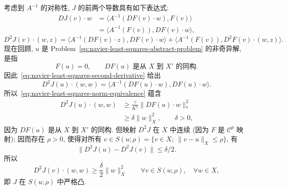 \begin{Proof}
考虑到 $A^{-1}$ 的对称性, $J$ 的前两个导数具有如下表达式:
\begin{equation}
\label{eq:navier-least-squares-first-derivative}
\begin{aligned}
DJ(v)\mathbin{\cdot}w
&=\langle A^{-1}(DF(v)\mathbin{\cdot}w),F(v)\rangle\\
&=\langle A^{-1}(F(v)),DF(v)\mathbin{\cdot}w\rangle,
\end{aligned}
\end{equation}
\begin{equation}
\label{eq:navier-least-squares-second-derivative}
D^2J(v)\mathbin{\cdot}(w,z)
=\langle A^{-1}(DF(v)\mathbin{\cdot}z),DF(v)\mathbin{\cdot}w\rangle
+\langle A^{-1}(F(v)),D^2F(v)\mathbin{\cdot}(w,z)\rangle.
\end{equation}
现在回顾, $u$ 是 Problem~\eqref{eq:navier-least-squares-abstract-problem} 的非奇异解,
是指
\[
F(u)=0,
\qquad DF(u)\text{ 是从 }X\text{ 到 }X'\text{ 的同构}.
\]
因此 \,\eqref{eq:navier-least-squares-second-derivative} 给出
\begin{equation}
\label{eq:navier-least-squares-hessian-at-solution}
D^2J(u)\mathbin{\cdot}(w,w)
=\langle A^{-1}(DF(u)\mathbin{\cdot}w),DF(u)\mathbin{\cdot}w\rangle.
\end{equation}
所以 \,\eqref{eq:navier-least-squares-norm-equivalence} 蕴含
\[
\begin{aligned}
D^2J(u)\mathbin{\cdot}(w,w)
&\geq\frac\gamma{K^2}\|DF(u)\mathbin{\cdot}w\|_*^2\\
&\geq\delta\|w\|_X^2,
\qquad \delta>0,
\end{aligned}
\]
因为 $DF(u)$ 是从 $X$ 到 $X'$ 的同构. 但映射 $D^2J$ 在 $X$ 中连续
(因为 $F$ 是 $\mathcal C^p$ 映射); 因而存在 $\rho>0$, 使得对所有
$v\in S(u;\rho)=\{v\in X;\ \|v-u\|_X\leq\rho\}$, 有
\[
\|D^2J(u)-D^2J(v)\|\leq\delta/2.
\]
所以
\begin{equation}
\label{eq:navier-least-squares-local-strong-convexity}
D^2J(v)\mathbin{\cdot}(w,w)\geq\frac\delta2\|w\|_X^2
\qquad\forall v\in S(u;\rho),\quad\forall w\in X,
\end{equation}
即 $J$ 在 $S(u;\rho)$ 中严格凸.
\end{Proof}

